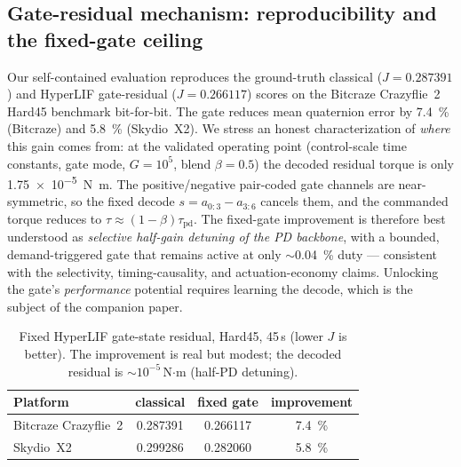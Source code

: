 %

\subsection{Gate-residual mechanism: reproducibility and the fixed-gate ceiling}
\label{sec:mech_fixed}
Our self-contained evaluation reproduces the ground-truth classical
($J{=}0.287391$) and HyperLIF gate-residual ($J{=}0.266117$) scores on the
Bitcraze Crazyflie~2 Hard45 benchmark bit-for-bit. The gate reduces mean
quaternion error by \SI{7.4}{\percent} (Bitcraze) and \SI{5.8}{\percent}
(Skydio~X2). We stress an honest characterization of \emph{where} this gain comes
from: at the validated operating point (control-scale time constants, gate mode,
$G{=}10^5$, blend $\beta{=}0.5$) the decoded residual torque is only
\SI{1.75e-5}{N.m}. The positive/negative pair-coded gate channels are
near-symmetric, so the fixed decode $s=a_{0:3}-a_{3:6}$ cancels them, and the
commanded torque reduces to $\tau\!\approx\!(1{-}\beta)\tau_\mathrm{pd}$. The
fixed-gate improvement is therefore best understood as \emph{selective half-gain
detuning of the PD backbone}, with a bounded, demand-triggered gate that remains
active at only $\sim$\SI{0.04}{\percent} duty --- consistent with the
selectivity, timing-causality, and actuation-economy claims. Unlocking the gate's
\emph{performance} potential requires learning the decode, which is the subject of
the companion paper.

\begin{table}[t]
\caption{Fixed HyperLIF gate-state residual, Hard45, 45\,s (lower $J$ is
better). The improvement is real but modest; the decoded residual is
$\sim\!10^{-5}$\,N$\cdot$m (half-PD detuning).}
\label{tab:fixed_cross}
\centering\small
\begin{tabular}{@{}lccc@{}}
\toprule
Platform & classical & fixed gate & improvement \\
\midrule
Bitcraze Crazyflie~2 & 0.287391 & 0.266117 & \SI{7.4}{\percent} \\
Skydio~X2            & 0.299286 & 0.282060 & \SI{5.8}{\percent} \\
\bottomrule
\end{tabular}
\end{table}

